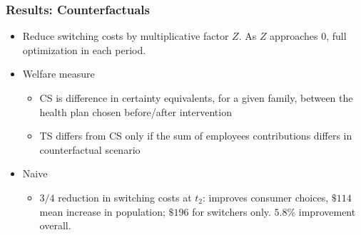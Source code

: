 
\begin{frame}
\frametitle{Results: Counterfactuals}

\begin{itemize}
\item Reduce switching costs by multiplicative factor $Z$.  As $Z$ approaches $0$, full optimization in each period.
\item Welfare measure

\begin{itemize}
\item CS is difference in certainty equivalents, for a given family, between the health plan chosen before/after intervention
\item TS differs from CS only if the sum of employees contributions differs in counterfactual scenario
\end{itemize}

\item Naive
\begin{itemize}
\item $3/4$ reduction in switching costs at $t_{2}$: improves consumer choices, $\$114$ mean increase in population; $\$196$ for switchers only.  $5.8\%$ improvement overall.
\end{itemize}
\end{itemize}

\end{frame}


